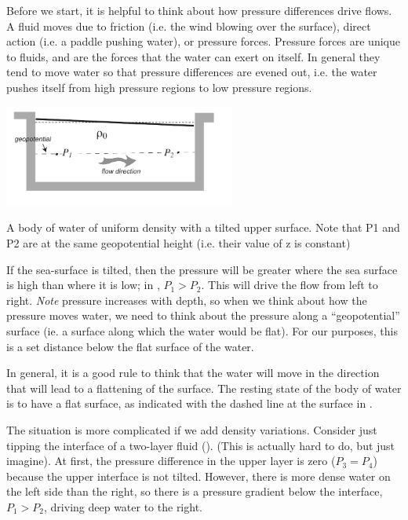 Before we start, it is helpful to think about how pressure differences drive flows.  A fluid moves due to friction (i.e. the wind blowing over the surface), direct action (i.e. a paddle pushing water), or pressure forces.  Pressure forces are unique to fluids, and are the forces that the water can exert on itself. In general they tend to move water so that pressure differences are evened out, i.e. the water pushes itself from high pressure regions to low pressure regions.  
\begin{marginfigure}
  \centering
  \includegraphics[width=3in]{figs/PdiffSurf}
  \caption{A body of water of uniform density with a tilted upper
    surface.  Note that P1 and P2 are at the same geopotential height (i.e. their value of z is constant)}
  \label{fig:PdiffSurf}
\end{marginfigure}
 
If the sea-surface is tilted, then the pressure will be greater where the sea surface is high than where it is low; in , $P_1>P_2$.  This will drive the flow from left to right.  \emph{Note} pressure increases with depth, so when we think about how the pressure moves water, we need to think about the pressure along a ``geopotential'' surface (ie. a surface along which the water would be flat).  For our purposes, this is a set distance below the flat surface of the water.


In general, it is a good rule to think that the water will move in the direction that will lead to a flattening of the surface.  The resting state of the body of water is to have a flat surface, as indicated with the dashed line at the surface in .  

The situation is more complicated if we add density variations. Consider just tipping the interface of a two-layer fluid (). (This is actually hard to do, but just
 imagine).  At first, the pressure difference in the upper layer is zero ($P_3=P_4$) because the upper interface is not tilted.  However, there is more dense water on the left side than the right, so there is a pressure gradient below the interface, $P_1>P_2$, driving deep water to the right.

